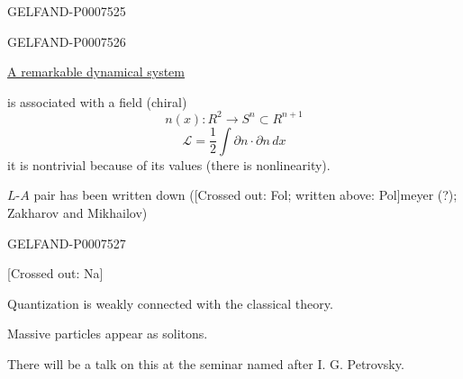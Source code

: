 \begin{GelfandAdjacentEvidence}{GELFAND-P000752}{5}

\end{GelfandAdjacentEvidence}
\begin{GelfandAdjacentEvidence}{GELFAND-P000752}{6}


\underline{A remarkable dynamical system}

is associated with a field (chiral)
\begin{equation*}
n(x):R^2\longrightarrow S^n\subset R^{n+1}
\tag{50}
\end{equation*}
\begin{equation*}
\mathcal L=\frac12\int\partial n\cdot\partial n\,dx
\tag{51}
\end{equation*}
it is nontrivial because of its values (there is nonlinearity).

\(L\)-\(A\) pair has been written down ([Crossed out: Fol; written above: Pol]meyer (?); Zakharov and Mikhailov)
\end{GelfandAdjacentEvidence}
\begin{GelfandAdjacentEvidence}{GELFAND-P000752}{7}


[Crossed out: Na]
\end{GelfandAdjacentEvidence}

Quantization is weakly connected with the classical theory.

Massive particles appear as solitons.

There will be a talk on this at the seminar named after I. G. Petrovsky.


